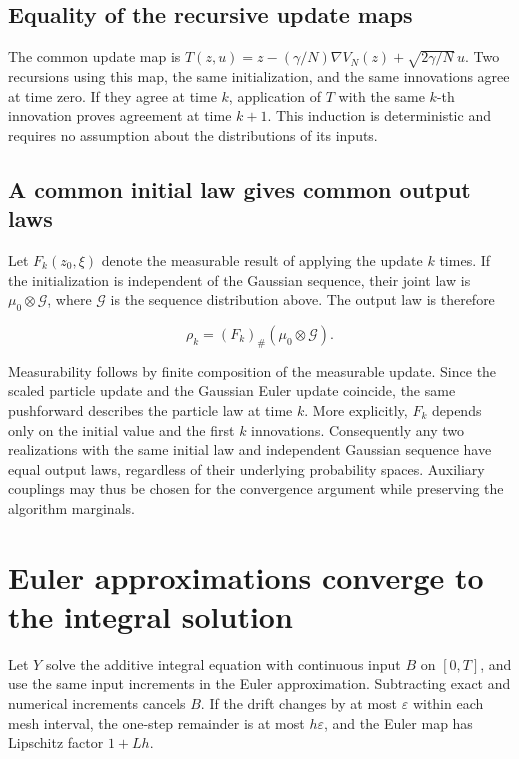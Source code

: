 \documentclass[11pt,a4paper]{article}
\begin{document}
\subsection{\texorpdfstring{Equality of the recursive update maps}{Equality of the recursive update maps}}


The common update map is \(T(z,u)=z-(\gamma/N)\nabla V_N(z)+\sqrt{2\gamma/N}\,u\). Two recursions using this map, the same initialization, and the same innovations agree at time zero. If they agree at time \(k\), application of \(T\) with the same \(k\)-th innovation proves agreement at time \(k+1\). This induction is deterministic and requires no assumption about the distributions of its inputs.




\subsection{\texorpdfstring{A common initial law gives common output laws}{A common initial law gives common output laws}}


Let \(F_k(z_0,\xi)\) denote the measurable result of applying the update \(k\) times. If the initialization is independent of the Gaussian sequence, their joint law is \(\mu_0\otimes\mathcal G\), where \(\mathcal G\) is the sequence distribution above. The output law is therefore

\[\rho_k=(F_k)_\#(\mu_0\otimes\mathcal G).\]

Measurability follows by finite composition of the measurable update. Since the scaled particle update and the Gaussian Euler update coincide, the same pushforward describes the particle law at time \(k\). More explicitly, \(F_k\) depends only on the initial value and the first \(k\) innovations. Consequently any two realizations with the same initial law and independent Gaussian sequence have equal output laws, regardless of their underlying probability spaces. Auxiliary couplings may thus be chosen for the convergence argument while preserving the algorithm marginals.




\section{\texorpdfstring{Euler approximations converge to the integral solution}{Euler approximations converge to the integral solution}}


Let \(Y\) solve the additive integral equation with continuous input \(B\) on \([0,T]\), and use the same input increments in the Euler approximation. Subtracting exact and numerical increments cancels \(B\). If the drift changes by at most \(\varepsilon\) within each mesh interval, the one-step remainder is at most \(h\varepsilon\), and the Euler map has Lipschitz factor \(1+Lh\).
\end{document}
